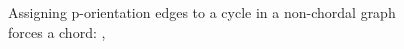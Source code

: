 \documentclass[letterpaper]{article}
\numberwithin{equation}{section}
\numberwithin{theorem}{section}
\numberwithin{lemma}{section}
\numberwithin{df}{section}
\begin{document}
\begin{figure}[ht]
\centering
{}\hspace{5pt}
\label{fig:subfigureExample}
\caption[]{Assigning p-orientation edges to a cycle in a non-chordal graph forces a chord: , }
\end{figure}
\end{document}
